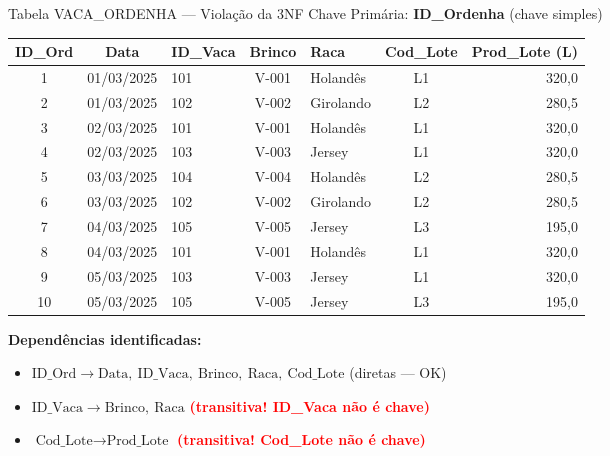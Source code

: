 \documentclass[9pt]{beamer}
\begin{document}
\begin{frame}{Tabela VACA\_ORDENHA — Violação da 3NF}
\tiny
Chave Primária: \textbf{ID\_Ordenha} \quad (chave simples)
\vspace{0.15cm}
\centering
\begin{tabular}{|c|c|l|c|l|c|r|}
  \hline
  \textbf{ID\_Ord} & \textbf{Data} & \textbf{ID\_Vaca} & \textbf{Brinco} & \textbf{Raca} & \textbf{Cod\_Lote} & \textbf{Prod\_Lote (L)} \\ \hline
  1 & 01/03/2025 & 101 & V-001 & Holandês    & L1 & \color{red}320,0 \\ \hline
  2 & 01/03/2025 & 102 & V-002 & Girolando   & L2 & \color{red}280,5 \\ \hline
  3 & 02/03/2025 & 101 & V-001 & Holandês    & L1 & \color{red}320,0 \\ \hline
  4 & 02/03/2025 & 103 & V-003 & Jersey      & L1 & \color{red}320,0 \\ \hline
  5 & 03/03/2025 & 104 & V-004 & Holandês    & L2 & \color{red}280,5 \\ \hline
  6 & 03/03/2025 & 102 & V-002 & Girolando   & L2 & \color{red}280,5 \\ \hline
  7 & 04/03/2025 & 105 & V-005 & Jersey      & L3 & \color{red}195,0 \\ \hline
  8 & 04/03/2025 & 101 & V-001 & Holandês    & L1 & \color{red}320,0 \\ \hline
  9 & 05/03/2025 & 103 & V-003 & Jersey      & L1 & \color{red}320,0 \\ \hline
  10& 05/03/2025 & 105 & V-005 & Jersey      & L3 & \color{red}195,0 \\ \hline
\end{tabular}

\vspace{0.2cm}
\flushleft
\textbf{Dependências identificadas:}
\begin{itemize}
  \item $\text{ID\_Ord} \to \text{Data},\ \text{ID\_Vaca},\ \text{Brinco},\ \text{Raca},\ \text{Cod\_Lote}$ \quad \textcolor{green!60!black}{(diretas — OK)}
  \item $\text{ID\_Vaca} \to \text{Brinco},\ \text{Raca}$ \quad \textcolor{red}{\textbf{(transitiva! ID\_Vaca não é chave)}}
  \item $\text{Cod\_Lote} \to \text{Prod\_Lote}$ \quad \textcolor{red}{\textbf{(transitiva! Cod\_Lote não é chave)}}
\end{itemize}
\end{frame}
\end{document}
